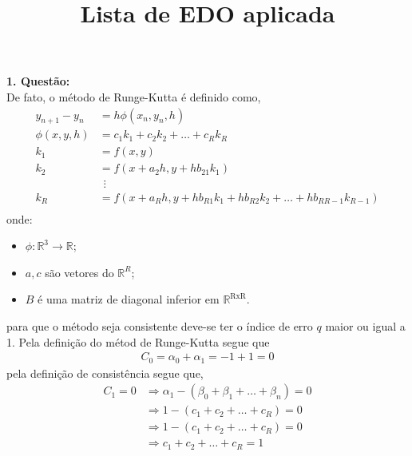 \documentclass[a4paper,12pt]{article}
\title{ Lista de EDO aplicada}
\date{\vspace{-5ex}}
\begin{document}
\maketitle\thispagestyle{fancy}
\textbf{1. Quest\~ao:}\\

De fato, o m\'etodo de Runge-Kutta \'e definido como,\\
\begin{align*}
	y_{n+1} - y_{n} &= h\phi(x_{n},y_{n},h)\\
	\phi(x,y,h) &= {c_1}{k_1} + {c_2}{k_2} + \dots + {c_R}{k_R}\\
	k_1 &= f(x,y)\\ 
	k_2 &= f(x + a_2 h,y + hb_{21}{k_1})\\ 
	& \hspace{5pt}\vdots  \\
	k_R &= f(x + a_R h,y + hb_{R1}{k_1} + hb_{R2}{k_2} + \dots + hb_{RR-1}{k_{R-1}})\\ 
\end{align*}
onde:\\
\begin{itemize}
	\item $\phi :\mathbb{R}^{3} \rightarrow \mathbb{R}$;
	\item $a,c$ s\~ao vetores do $\mathbb{R}^{R}$; 
	\item $B$ \'e uma matriz de diagonal inferior em $\mathbb{R}^{\mathrm{RxR}}$.
\end{itemize}
para que o m\'etodo seja consistente deve-se ter o \'indice de erro $q$ maior ou igual a 1. Pela defini\c c\~ao do
m\'etod de Runge-Kutta segue que
\begin{align*}
	C_0 = {\alpha}_0 + {\alpha}_1 = -1 + 1 = 0
\end{align*}
pela defini\c c\~ao de consist\^encia segue que,
\begin{align*}
	C_1 = 0 &\Rightarrow {\alpha}_{1} - ({\beta}_{0} + {\beta}_{1} + \dots + {\beta}_{n} ) = 0 \\
	&\Rightarrow 1 -(c_1 + c_2 + \dots + c_R) = 0  \\
	&\Rightarrow 1 -(c_1 + c_2 + \dots + c_R) = 0  \\
	&\Rightarrow c_1 + c_2 + \dots + c_R = 1 
\end{align*}
\end{document}
